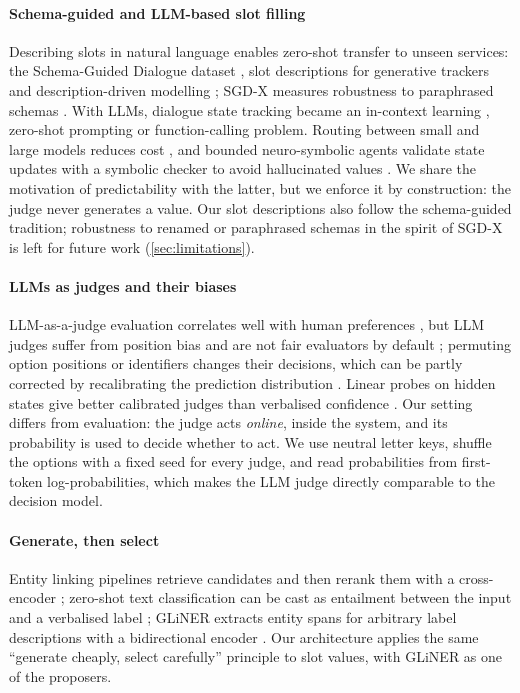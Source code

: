 \paragraph{Schema-guided and LLM-based slot filling}
Describing slots in natural language enables zero-shot transfer to unseen services: the Schema-Guided Dialogue dataset \citep{rastogi2020sgd}, slot descriptions for generative trackers \citep{lin2021t5dst} and description-driven modelling \citep{zhao2022d3st}; SGD-X measures robustness to paraphrased schemas \citep{lee2022sgdx}. With LLMs, dialogue state tracking became an in-context learning \citep{hu2022icdst}, zero-shot prompting \citep{heck2023chatgpt} or function-calling \citep{li2024fnctod} problem. Routing between small and large models reduces cost \citep{lee2024orchestrallm}, and bounded neuro-symbolic agents validate state updates with a symbolic checker to avoid hallucinated values \citep{lin2026reactod}. We share the motivation of predictability with the latter, but we enforce it by construction: the judge never generates a value. Our slot descriptions also follow the schema-guided tradition; robustness to renamed or paraphrased schemas in the spirit of SGD-X is left for future work (\cref{sec:limitations}).

\paragraph{LLMs as judges and their biases}
LLM-as-a-judge evaluation correlates well with human preferences \citep{zheng2023mtbench,liu2023geval}, but LLM judges suffer from position bias and are not fair evaluators by default \citep{wang2024fair}; permuting option positions or identifiers changes their decisions, which can be partly corrected by recalibrating the prediction distribution \citep{li2025calibraeval}. Linear probes on hidden states give better calibrated judges than verbalised confidence \citep{radharapu2026calibrating}. Our setting differs from evaluation: the judge acts \emph{online}, inside the system, and its probability is used to decide whether to act. We use neutral letter keys, shuffle the options with a fixed seed for every judge, and read probabilities from first-token log-probabilities, which makes the LLM judge directly comparable to the decision model.

\paragraph{Generate, then select}
Entity linking pipelines retrieve candidates and then rerank them with a cross-encoder \citep{wu2020blink}; zero-shot text classification can be cast as entailment between the input and a verbalised label \citep{yin2019benchmarking}; GLiNER extracts entity spans for arbitrary label descriptions with a bidirectional encoder \citep{zaratiana2024gliner}. Our architecture applies the same ``generate cheaply, select carefully'' principle to slot values, with GLiNER as one of the proposers.

